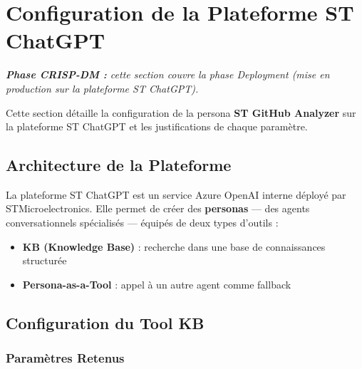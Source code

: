 
\section{Configuration de la Plateforme ST ChatGPT}
\label{chap:configuration}

\textit{\small\textbf{\textcolor{stblue}{Phase CRISP-DM :}} cette section couvre la phase \textit{Deployment} (mise en production sur la plateforme ST ChatGPT).}\par\smallskip

Cette section détaille la configuration de la persona \textbf{ST GitHub Analyzer} sur la plateforme ST ChatGPT et les justifications de chaque paramètre.

\subsection{Architecture de la Plateforme}

La plateforme ST ChatGPT est un service Azure OpenAI interne déployé par STMicroelectronics. Elle permet de créer des \textbf{personas} --- des agents conversationnels spécialisés --- équipés de deux types d'outils :

\begin{itemize}
  \item \textbf{KB (Knowledge Base)} : recherche dans une base de connaissances structurée
  \item \textbf{Persona-as-a-Tool} : appel à un autre agent comme fallback
\end{itemize}

\subsection{Configuration du Tool KB}

\subsubsection{Paramètres Retenus}

